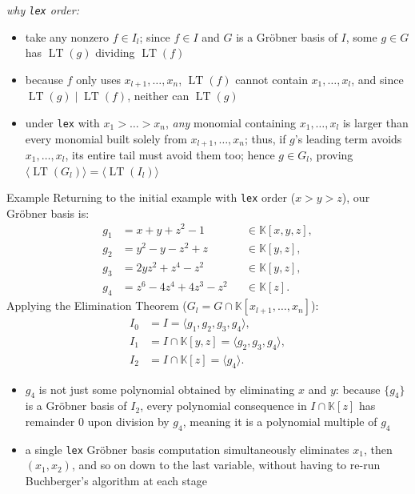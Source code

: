 \documentclass[a4paper, 11pt]{report}
\newcommand{\LT}{\operatorname{LT}}
\begin{document}
\textit{why \texttt{lex} order:}
\begin{itemize}
    \item take any nonzero $f \in I_l$; since $f \in I$ and $G$ is a Gröbner basis of $I$, some $g \in G$ has $\LT(g)$ dividing $\LT(f)$
    \item because $f$ only uses $x_{l+1}, \dots, x_n$, $\LT(f)$ cannot contain $x_1, \dots, x_l$, and since $\LT(g) \mid \LT(f)$, neither can $\LT(g)$
    \item under \texttt{lex} with $x_1 > \dots > x_n$, \emph{any} monomial containing $x_1, \dots, x_l$ is larger than every monomial built solely from $x_{l+1}, \dots, x_n$; thus, if $g$'s leading term avoids $x_1, \dots, x_l$, its entire tail must avoid them too; hence $g \in G_l$, proving $\langle \LT(G_l) \rangle = \langle \LT(I_l) \rangle$
\end{itemize}

\begin{gframe}{Example}
Returning to the initial example with \texttt{lex} order ($x > y > z$), our Gröbner basis is:
\begin{align*}
    g_1 &= x + y + z^2 - 1 &&\in \mathbb{K}[x, y, z], \\
    g_2 &= y^2 - y - z^2 + z &&\in \mathbb{K}[y, z], \\
    g_3 &= 2yz^2 + z^4 - z^2 &&\in \mathbb{K}[y, z], \\
    g_4 &= z^6 - 4z^4 + 4z^3 - z^2 &&\in \mathbb{K}[z].
\end{align*}
Applying the Elimination Theorem ($G_l = G \cap \mathbb{K}[x_{l+1}, \dots, x_n]$):
\begin{align*}
    I_0 &= I = \langle g_1, g_2, g_3, g_4 \rangle, \\
    I_1 &= I \cap \mathbb{K}[y, z] = \langle g_2, g_3, g_4 \rangle, \\
    I_2 &= I \cap \mathbb{K}[z] = \langle g_4 \rangle.
\end{align*}
\end{gframe}
\begin{itemize}
    \item $g_4$ is not just some polynomial obtained by eliminating $x$ and $y$: because $\{g_4\}$ is a Gröbner basis of $I_2$, every polynomial consequence in $I \cap \mathbb{K}[z]$ has remainder $0$ upon division by $g_4$, meaning it is a polynomial multiple of $g_4$
    \item a single \texttt{lex} Gröbner basis computation simultaneously eliminates $x_1$, then $(x_1, x_2)$, and so on down to the last variable, without having to re-run Buchberger's algorithm at each stage
\end{itemize}
\end{document}
